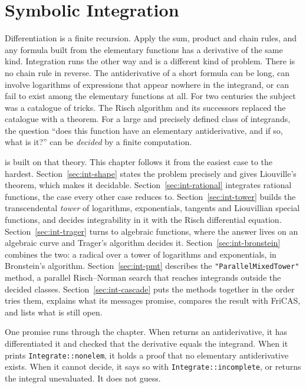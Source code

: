 \chapter{Symbolic Integration}
\label{ch:integration}


Differentiation is a finite recursion. Apply the sum, product and chain rules, and
any formula built from the elementary functions has a derivative of the same kind.
Integration runs the other way and is a different kind of problem. There is no
chain rule in reverse. The antiderivative of a short formula can be long, can
involve logarithms of expressions that appear nowhere in the integrand, or can fail
to exist among the elementary functions at all. For two centuries the subject was
a catalogue of tricks. The Risch algorithm and its successors replaced the
catalogue with a theorem. For a large and precisely defined class of integrands,
the question ``does this function have an elementary antiderivative, and if so,
what is it?'' can be \emph{decided} by a finite computation.

 is built on that theory. This chapter follows it from the easiest
case to the hardest. Section~\ref{sec:int-shape} states the problem precisely and
gives Liouville's theorem, which makes it decidable.
Section~\ref{sec:int-rational} integrates rational functions, the case every
other case reduces to. Section~\ref{sec:int-tower} builds the transcendental
\emph{tower} of logarithms, exponentials, tangents and Liouvillian special
functions, and decides integrability in it with the Risch differential equation.
Section~\ref{sec:int-trager} turns to algebraic functions, where the answer lives
on an algebraic curve and Trager's algorithm decides it.
Section~\ref{sec:int-bronstein} combines the two: a radical over a tower of
logarithms and exponentials, in Bronstein's algorithm.
Section~\ref{sec:int-pmt} describes the \texttt{"ParallelMixedTower"} method, a
parallel Risch--Norman search that reaches integrands outside the decided
classes. Section~\ref{sec:int-cascade} puts the methods together in the order
 tries them, explains what its messages promise, compares the result
with FriCAS, and lists what is still open.

One promise runs through the chapter. When  returns an
antiderivative, it has differentiated it and checked that the derivative equals
the integrand. When it prints \texttt{Integrate::nonelem}, it holds a proof that no
elementary antiderivative exists. When it cannot decide, it says so with
\texttt{Integrate::incomplete}, or returns the integral unevaluated. It does not
guess.

